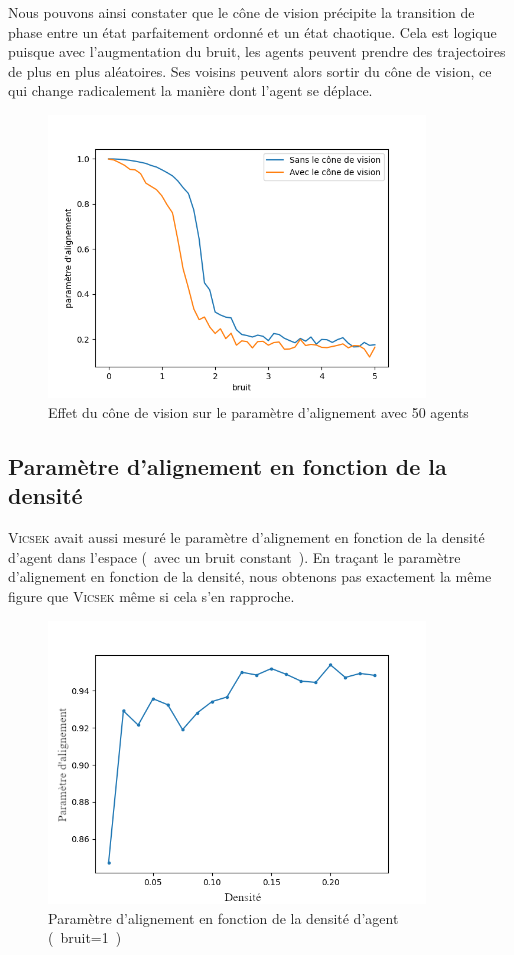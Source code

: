 \documentclass[french, a4paper, 12pt, openany]{report}
\begin{document}
	Nous pouvons ainsi constater que le cône de vision précipite la transition de phase entre un état parfaitement ordonné et un état chaotique. Cela est logique puisque avec l'augmentation du bruit, les agents peuvent prendre des trajectoires de plus en plus aléatoires. Ses voisins peuvent alors sortir du cône de vision, ce qui change radicalement la manière dont l'agent se déplace.
	 \begin{figure}[!h]
		\centering
		\includegraphics[width=10cm]{images/bruit_comparaison[50 mesures par pts].png}
		\caption{Effet du cône de vision sur le paramètre d'alignement avec 50 agents}
		\label{cone_vision_alignement}
	\end{figure}
    \newpage
    \subsection{Paramètre d'alignement en fonction de la densité}

    \textsc{Vicsek} avait aussi mesuré le paramètre d'alignement en fonction de la densité d'agent dans l'espace (~avec un bruit constant~). En traçant le paramètre d'alignement en fonction de la densité, nous obtenons pas exactement la même figure que \textsc{Vicsek} même si cela s'en rapproche.
      
       \begin{figure}[!h]
		\centering
		\includegraphics[width=10cm]{images/densite_1[noise=1]2.png}
		\caption{Paramètre d'alignement en fonction de la densité d'agent (~bruit=1~)}
		\label{densité_alignement}
	\end{figure}
	
\end{document}
